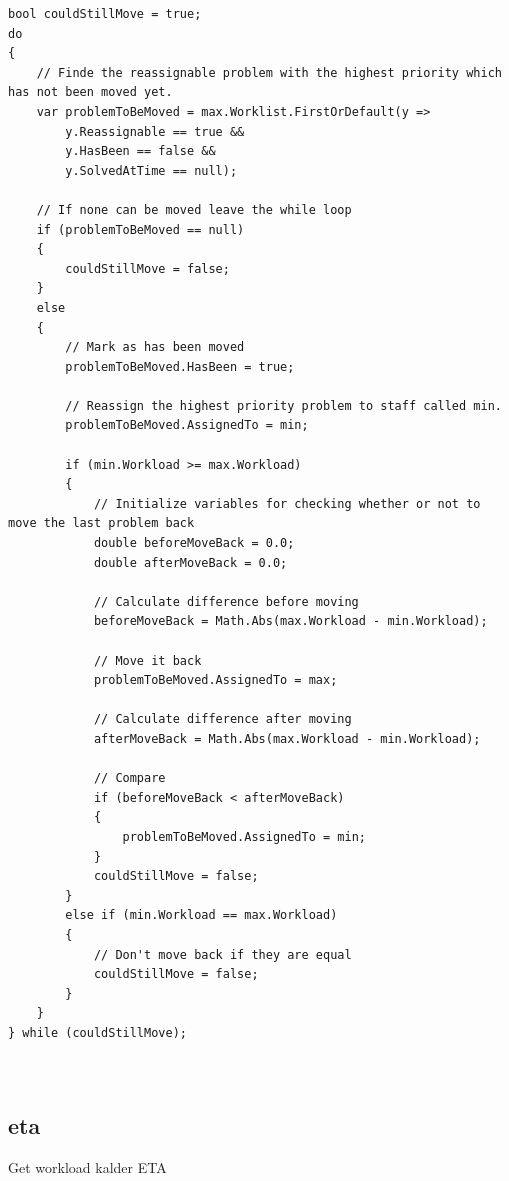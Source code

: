


\begin{lstlisting}[style=sourceCode, caption=\myCaption{A code snippet of the balance workload method. The presented code is within a for loop running for each staff member minus one. ``min'' and ``max'' are the person objects of which the algorithm are currently moving problems between.}, label=lst:balanceWorkload]
bool couldStillMove = true;
do
{
    // Finde the reassignable problem with the highest priority which has not been moved yet. 
    var problemToBeMoved = max.Worklist.FirstOrDefault(y =>
	    y.Reassignable == true &&
	    y.HasBeen == false &&
	    y.SolvedAtTime == null);
                  
    // If none can be moved leave the while loop
    if (problemToBeMoved == null)
    {
        couldStillMove = false;
    }
    else
    {
        // Mark as has been moved
        problemToBeMoved.HasBeen = true;

        // Reassign the highest priority problem to staff called min.
        problemToBeMoved.AssignedTo = min;

        if (min.Workload >= max.Workload)
        {
            // Initialize variables for checking whether or not to move the last problem back
            double beforeMoveBack = 0.0;
            double afterMoveBack = 0.0;

            // Calculate difference before moving
            beforeMoveBack = Math.Abs(max.Workload - min.Workload);

            // Move it back
            problemToBeMoved.AssignedTo = max;

            // Calculate difference after moving
            afterMoveBack = Math.Abs(max.Workload - min.Workload);

            // Compare
            if (beforeMoveBack < afterMoveBack)
            {
                problemToBeMoved.AssignedTo = min;
            }
            couldStillMove = false;
        }
        else if (min.Workload == max.Workload)
        {
            // Don't move back if they are equal
            couldStillMove = false;
        }
    }
} while (couldStillMove);



\end{lstlisting}




\subsection{eta}
\label{}


Get workload kalder ETA